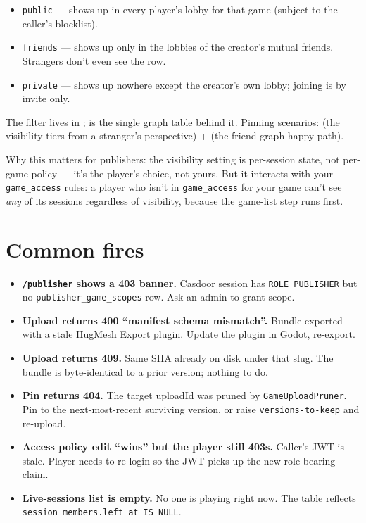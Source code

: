 \documentclass[11pt,a4paper,openany]{book}
\begin{document}
\begin{itemize}
  \item \texttt{public} --- shows up in every player's lobby for that
        game (subject to the caller's blocklist).
  \item \texttt{friends} --- shows up only in the lobbies of the
        creator's mutual friends. Strangers don't even see the row.
  \item \texttt{private} --- shows up nowhere except the creator's
        own lobby; joining is by invite only.
\end{itemize}

The filter lives in ;
 is the single graph table behind it.
Pinning scenarios:
 (the
visibility tiers from a stranger's perspective) +
 (the
friend-graph happy path).

Why this matters for publishers: the visibility setting is per-session
state, not per-game policy --- it's the player's choice, not yours.
But it interacts with your \texttt{game\_access} rules: a player who
isn't in \texttt{game\_access} for your game can't see \emph{any} of
its sessions regardless of visibility, because the game-list step
runs first.

\chapter{Common fires}
\begin{itemize}
  \item \textbf{\texttt{/publisher} shows a 403 banner.} Casdoor
        session has \texttt{ROLE\_PUBLISHER} but no
        \texttt{publisher\_game\_scopes} row. Ask an admin to grant
        scope.
  \item \textbf{Upload returns 400 ``manifest schema mismatch''.}
        Bundle exported with a stale HugMesh Export plugin.
        Update the plugin in Godot, re-export.
  \item \textbf{Upload returns 409.} Same SHA already on disk under
        that slug. The bundle is byte-identical to a prior version;
        nothing to do.
  \item \textbf{Pin returns 404.} The target uploadId was pruned by
        \texttt{GameUploadPruner}. Pin to the next-most-recent
        surviving version, or raise \texttt{versions-to-keep} and
        re-upload.
  \item \textbf{Access policy edit ``wins'' but the player still
        403s.} Caller's JWT is stale. Player needs to re-login so the
        JWT picks up the new role-bearing claim.
  \item \textbf{Live-sessions list is empty.} No one is playing right
        now. The table reflects \texttt{session\_members.left\_at IS
        NULL}.
\end{itemize}
\end{document}
